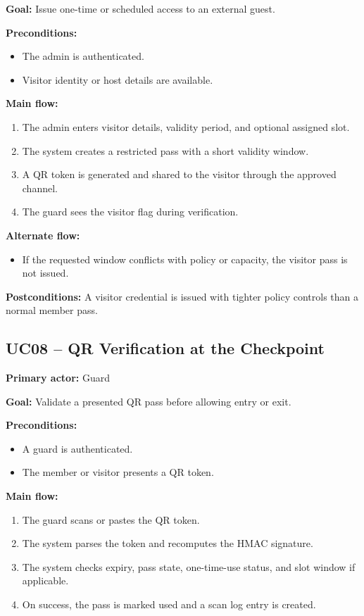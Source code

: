 \documentclass[12pt,letterpaper]{article}
\begin{document}
\textbf{Goal:} Issue one-time or scheduled access to an external guest.

\textbf{Preconditions:}
\begin{itemize}
    \item The admin is authenticated.
    \item Visitor identity or host details are available.
\end{itemize}

\textbf{Main flow:}
\begin{enumerate}
    \item The admin enters visitor details, validity period, and optional assigned slot.
    \item The system creates a restricted pass with a short validity window.
    \item A QR token is generated and shared to the visitor through the approved channel.
    \item The guard sees the visitor flag during verification.
\end{enumerate}

\textbf{Alternate flow:}
\begin{itemize}
    \item If the requested window conflicts with policy or capacity, the visitor pass is not issued.
\end{itemize}

\textbf{Postconditions:} A visitor credential is issued with tighter policy controls than a normal member pass.

\subsection{UC08 -- QR Verification at the Checkpoint}
\textbf{Primary actor:} Guard

\textbf{Goal:} Validate a presented QR pass before allowing entry or exit.

\textbf{Preconditions:}
\begin{itemize}
    \item A guard is authenticated.
    \item The member or visitor presents a QR token.
\end{itemize}

\textbf{Main flow:}
\begin{enumerate}
    \item The guard scans or pastes the QR token.
    \item The system parses the token and recomputes the HMAC signature.
    \item The system checks expiry, pass state, one-time-use status, and slot window if applicable.
    \item On success, the pass is marked used and a scan log entry is created.
\end{enumerate}
\end{document}
